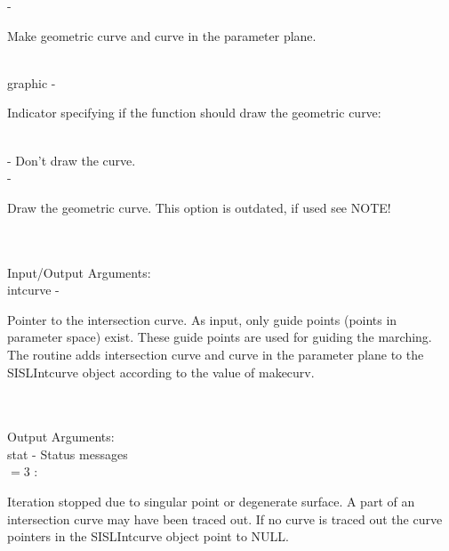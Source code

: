                 \>\>\>\> -     \>\begin{minipg5}
                                        Make geometric curve and curve in the parameter
                                        plane.
                                        \end{minipg5} \\[0.3ex]
        \>\>    {\fov graphic}\> - \>   \begin{minipg2}
                                Indicator specifying if the function
                                should draw the geometric curve:
                                \end{minipg2}\\
                \>\>\>\> -     \>Don't draw the curve.\\
                \>\>\>\> -     \>\begin{minipg5}
                                        Draw the geometric curve.  This option is
                                        outdated, if used see NOTE!
                                        \end{minipg5} \\[0.8ex]
\\
        \>Input/Output Arguments:\\
        \>\>    {\fov intcurve}\> - \>  \begin{minipg2}
                                Pointer to the intersection curve.
                                As input, only
                                guide points (points in parameter space)
                                exist. These guide points
                                are used for guiding the marching.
                                The routine adds
                                intersection curve and curve in the parameter
                                plane to the SISLIntcurve object according to the value
                                of makecurv.
                                \end{minipg2}\\[0.8ex]
\\
        \>Output Arguments:\\
        \>\>    {\fov stat}     \> - \> Status messages\\
                \>\>\>\>\>      $= 3$ : \>      \begin{minipg5}
                                                Iteration stopped due to singular
                                                point or degenerate surface. A part of
                                                an intersection curve may have been
                                                traced out. If no curve is traced out
                                                the curve pointers in the SISLIntcurve
                                                object point to NULL.
                                                \end{minipg5} \\[0.3ex]
